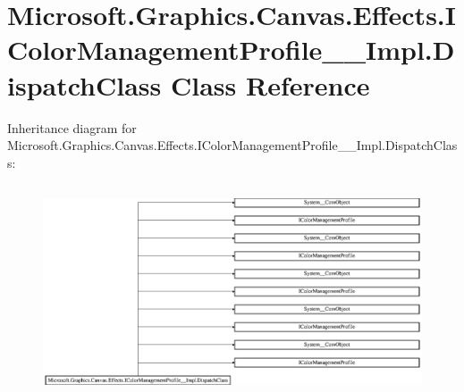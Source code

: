 \hypertarget{class_microsoft_1_1_graphics_1_1_canvas_1_1_effects_1_1_i_color_management_profile_____impl_1_1_dispatch_class}{}\section{Microsoft.\+Graphics.\+Canvas.\+Effects.\+I\+Color\+Management\+Profile\+\_\+\+\_\+\+Impl.\+Dispatch\+Class Class Reference}
\label{class_microsoft_1_1_graphics_1_1_canvas_1_1_effects_1_1_i_color_management_profile_____impl_1_1_dispatch_class}
Inheritance diagram for Microsoft.\+Graphics.\+Canvas.\+Effects.\+I\+Color\+Management\+Profile\+\_\+\+\_\+\+Impl.\+Dispatch\+Class\+:\begin{figure}[H]
\begin{center}
\leavevmode
\includegraphics[height=6.350515cm]{class_microsoft_1_1_graphics_1_1_canvas_1_1_effects_1_1_i_color_management_profile_____impl_1_1_dispatch_class}
\end{center}
\end{figure}
